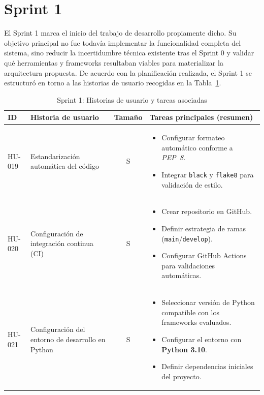 \documentclass{report}
\begin{document}
\section{Sprint 1}
\label{sect:Sp1}
El Sprint 1 marca el inicio del trabajo de desarrollo propiamente dicho. Su objetivo principal no fue todavía implementar la funcionalidad completa del sistema, sino reducir la incertidumbre técnica existente tras el Sprint 0 y validar qué herramientas y frameworks resultaban viables para materializar la arquitectura propuesta.
De acuerdo con la planificación realizada, el Sprint 1 se estructuró en torno a las historias de usuario recogidas en la Tabla~\ref{tab:sprint1}.
\begin{table}[H]
\centering
\footnotesize
\caption{Sprint 1: Historias de usuario y tareas asociadas}
\label{tab:sprint1}
\renewcommand{\arraystretch}{1.25}
\setlength{\tabcolsep}{4pt}

\begin{tabular}{|l|p{4.2cm}|c|p{6.2cm}|}
\hline
\textbf{ID} & \textbf{Historia de usuario} & \textbf{Tamaño} & \textbf{Tareas principales (resumen)} \\ \hline

HU-019 &
Estandarización automática del código &
S &
\begin{itemize}\setlength\itemsep{0.2em}
  \item Configurar formateo automático conforme a \textit{PEP~8}.
  \item Integrar \texttt{black} y \texttt{flake8} para validación de estilo.
\end{itemize}
\\ \hline

HU-020 &
Configuración de integración continua (CI) &
S &
\begin{itemize}\setlength\itemsep{0.2em}
  \item Crear repositorio en GitHub.
  \item Definir estrategia de ramas (\texttt{main}/\texttt{develop}).
  \item Configurar GitHub Actions para validaciones automáticas.
\end{itemize}
\\ \hline

HU-021 &
Configuración del entorno de desarrollo en Python &
S &
\begin{itemize}\setlength\itemsep{0.2em}
  \item Seleccionar versión de Python compatible con los frameworks evaluados.
  \item Configurar el entorno con \textbf{Python 3.10}.
  \item Definir dependencias iniciales del proyecto.
\end{itemize}
\\ \hline


\end{tabular}
\end{table}
\end{document}
